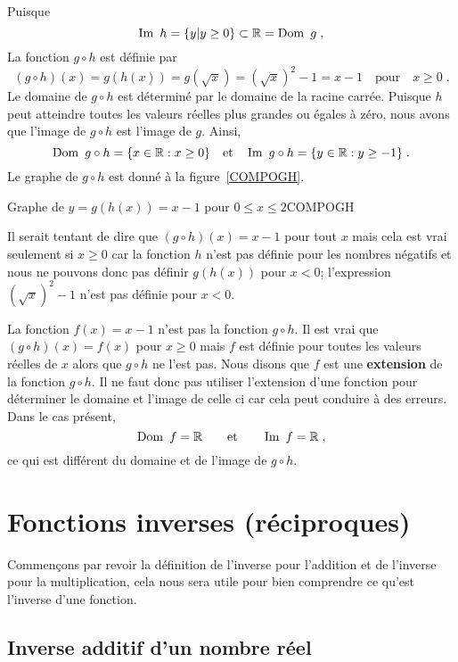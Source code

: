 {\begin{egg}
Puisque
\[
\IM h = \{ y | y \geq 0 \} \subset \RR = \DO g \; ,
\]
La fonction $g\circ h$ est définie par
\[
(g\circ h)(x) = g(h(x)) = g(\sqrt{x}) = \left(\sqrt{x}\right)^2-1 = x
- 1 \quad \text{pour} \quad x\geq 0 \; .
\]
Le domaine de $g\circ h$ est déterminé par le domaine de la racine
carrée.  Puisque $h$ peut atteindre toutes les valeurs réelles plus
grandes ou égales à zéro, nous avons que l'image de $g\circ h$ est
l'image de $g$.  Ainsi,
\[
\DO g\circ h = \{ x \in \RR : x \geq 0 \} \quad
\text{et} \quad \IM g\circ h = \{ y \in \RR : y \geq -1 \} \;.
\]
Le graphe de $g\circ h$ est donné à la figure~\ref{COMPOGH}.
\end{egg}

{Graphe de $y= g(h(x)) = x -1$ pour $0 \leq x \leq 2$}{COMPOGH}

\begin{rmk}
Il serait tentant de dire que
$\displaystyle (g\circ h)(x) = x - 1$ pour tout $x$ mais cela est vrai
seulement si $x\geq 0$ car la fonction $h$ n'est pas définie pour les
nombres négatifs et nous ne pouvons donc pas définir $g(h(x))$ pour $x<0$;
l'expression $\left(\sqrt{x}\right)^2-1$ n'est pas définie pour $x<0$.

La fonction $f(x) = x -1$ n'est pas la fonction $g\circ h$.  Il est
vrai que $(g\circ h)(x) = f(x)$ pour $x \geq 0$ mais $f$ est définie
pour toutes les valeurs réelles de $x$ alors que $g\circ h$ ne l'est
pas.  Nous disons que $f$ est une {\bfseries extension}
 de la fonction $g\circ h$.  Il ne faut donc
pas utiliser l'extension d'une fonction pour déterminer le domaine et
l'image de celle ci car cela peut conduire à des erreurs.  Dans le cas
présent,
\[
\DO f = \RR \qquad \text{et} \qquad \IM f = \RR \; ,
\]
ce qui est différent du domaine et de l'image de $g\circ h$.
\end{rmk}

\section{Fonctions inverses (réciproques)}

Commençons par revoir la définition de l'inverse pour l'addition et
de l'inverse pour la multiplication, cela nous sera utile pour bien
comprendre ce qu'est l'inverse d'une fonction.

\subsection{Inverse additif d'un nombre réel}

}
